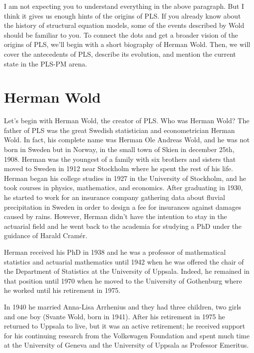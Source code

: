 \documentclass[12pt]{book}\usepackage{graphicx, color}
\begin{document}
I am not expecting you to understand everything in the above paragraph. But I think it gives us enough hints of the origins of PLS. If you already know about the history of structural equation models, some of the events described by Wold should be familiar to you. To connect the dots and get a broader vision of the origins of PLS, we'll begin with a short biography of Herman Wold. Then, we will cover the antecedents of PLS, describe its evolution, and mention the current state in the PLS-PM arena.



\section{Herman Wold}
Let's begin with Herman Wold, the creator of PLS. Who was Herman Wold? The father of PLS was the great Swedish statistician and econometrician Herman Wold. In fact, his complete name was Herman Ole Andreas Wold, and he was not born in Sweden but in Norway, in the small town of Skien in december 25th, 1908. Herman was the youngest of a family with six brothers and sisters that moved to Sweden in 1912 near Stockholm where he spent the rest of his life. Herman began his college studies in 1927 in the University of Stockholm, and he took courses in physics, mathematics, and economics. After graduating in 1930, he started to work for an insurance company gathering data about fluvial precipitation in Sweden in order to design a fee for insurances against damages caused by rains. However, Herman didn't have the intention to stay in the actuarial field and he went back to the academia for studying a PhD under the guidance of Harald Cram\'{e}r. 

Herman received his PhD in 1938 and he was a professor of mathematical statistics and actuarial mathematics until 1942 when he was offered the chair of the Department of Statistics at the University of Uppsala. Indeed, he remained in that position until 1970 when he moved to the University of Gothenburg where he worked until his retirement in 1975. 

In 1940 he married Anna-Lisa Arrhenius and they had three children, two girls and one boy (Svante Wold, born in 1941). After his retirement in 1975 he returned to Uppsala to live, but it was an active retirement; he received support for his continuing research from the Volkswagen Foundation and spent much time at the University of Geneva and the University of Uppsala as Professor Emeritus.
\end{document}

